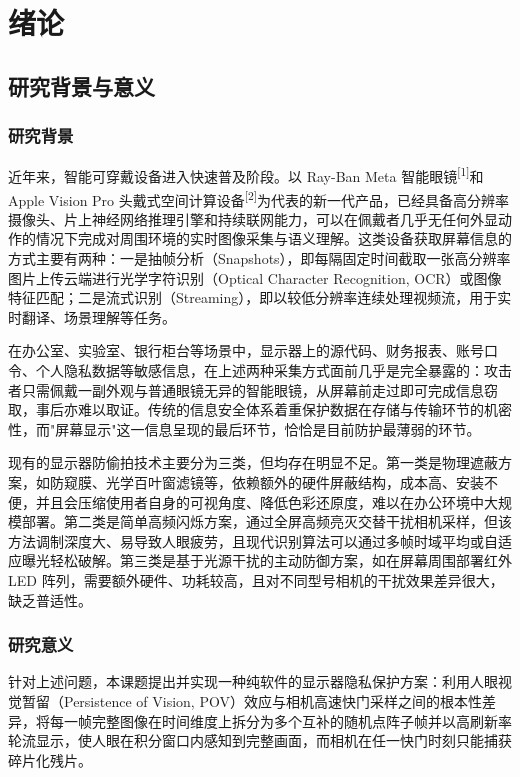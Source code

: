 \chapter{绪\quad 论}

\section{研究背景与意义}

\subsection{研究背景}

近年来，智能可穿戴设备进入快速普及阶段。以 Ray-Ban Meta 智能眼镜\textsuperscript{[1]}和 Apple Vision Pro 头戴式空间计算设备\textsuperscript{[2]}为代表的新一代产品，已经具备高分辨率摄像头、片上神经网络推理引擎和持续联网能力，可以在佩戴者几乎无任何外显动作的情况下完成对周围环境的实时图像采集与语义理解。这类设备获取屏幕信息的方式主要有两种：一是抽帧分析（Snapshots），即每隔固定时间截取一张高分辨率图片上传云端进行光学字符识别（Optical Character Recognition, OCR）或图像特征匹配；二是流式识别（Streaming），即以较低分辨率连续处理视频流，用于实时翻译、场景理解等任务。

在办公室、实验室、银行柜台等场景中，显示器上的源代码、财务报表、账号口令、个人隐私数据等敏感信息，在上述两种采集方式面前几乎是完全暴露的：攻击者只需佩戴一副外观与普通眼镜无异的智能眼镜，从屏幕前走过即可完成信息窃取，事后亦难以取证。传统的信息安全体系着重保护数据在存储与传输环节的机密性，而"屏幕显示"这一信息呈现的最后环节，恰恰是目前防护最薄弱的环节。

现有的显示器防偷拍技术主要分为三类，但均存在明显不足。第一类是物理遮蔽方案，如防窥膜、光学百叶窗滤镜等，依赖额外的硬件屏蔽结构，成本高、安装不便，并且会压缩使用者自身的可视角度、降低色彩还原度，难以在办公环境中大规模部署。第二类是简单高频闪烁方案，通过全屏高频亮灭交替干扰相机采样，但该方法调制深度大、易导致人眼疲劳，且现代识别算法可以通过多帧时域平均或自适应曝光轻松破解。第三类是基于光源干扰的主动防御方案，如在屏幕周围部署红外 LED 阵列，需要额外硬件、功耗较高，且对不同型号相机的干扰效果差异很大，缺乏普适性。

\subsection{研究意义}

针对上述问题，本课题提出并实现一种纯软件的显示器隐私保护方案：利用人眼视觉暂留（Persistence of Vision, POV）效应与相机高速快门采样之间的根本性差异，将每一帧完整图像在时间维度上拆分为多个互补的随机点阵子帧并以高刷新率轮流显示，使人眼在积分窗口内感知到完整画面，而相机在任一快门时刻只能捕获碎片化残片。

